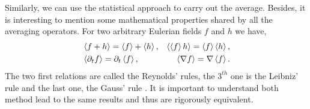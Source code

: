 Similarly, we can use the statistical approach to carry out the average. 
Besides, it is interesting to mention some mathematical properties shared by all the averaging operators. 
For two arbitrary Eulerian fields $f$ and $h$ we have,
\begin{align}
    &\left<f+h\right> = \left<f\right>+\left<h\right>, 
    &\left<\left<f\right>h\right> = \left<f\right>\left<h\right>, \nonumber \\
    &\left<\partial_t f\right> 
    = \partial_t\left<f\right>, 
    &\left<\mathbf{\nabla} f\right>
    = \mathbf{\nabla} \left<f\right>. 
    \label{eq:avg_properties}
\end{align}
The two first relations are called the Reynolds' rules, the $3^{th}$ one is the Leibniz' 
rule and the last one, the Gauss' rule \citep{drew1983mathematical}.
It is important to understand both method lead to the same results and thus are rigorously equivalent. 


